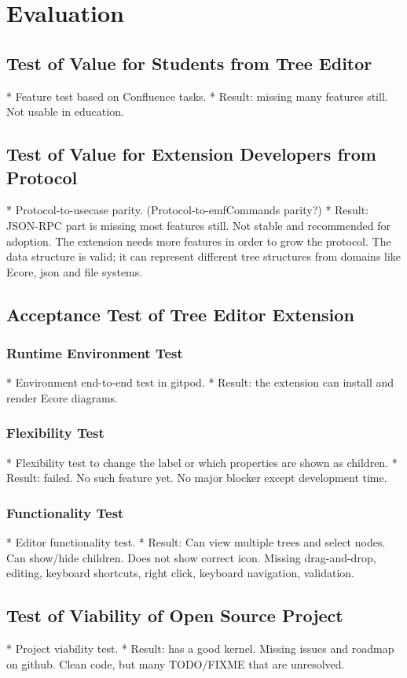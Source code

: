 \chapter{Evaluation}\label{chap:evaluation}


\section{Test of Value for Students from Tree Editor}

* Feature test based on Confluence tasks.
  * Result: missing many features still. Not usable in education.

\section{Test of Value for Extension Developers from Protocol}
* Protocol-to-usecase parity. (Protocol-to-emfCommands parity?)
  * Result: JSON-RPC part is missing most features still. Not stable and recommended for adoption. The extension needs more features in order to grow the protocol. The data structure is valid; it can represent different tree structures from domains like Ecore, json and file systems.

\section{Acceptance Test of Tree Editor Extension}

\subsection{Runtime Environment Test}
* Environment end-to-end test in gitpod.
  * Result: the extension can install and render Ecore diagrams.

\subsection{Flexibility Test}
* Flexibility test to change the label or which properties are shown as children.
  * Result: failed. No such feature yet. No major blocker except development time.

\subsection{Functionality Test}
* Editor functionality test.
  * Result: Can view multiple trees and select nodes. Can show/hide children. Does not show correct icon. Missing drag-and-drop, editing, keyboard shortcuts, right click, keyboard navigation, validation.

\section{Test of Viability of Open Source Project}
* Project viability test.
  * Result: has a good kernel. Missing issues and roadmap on github. Clean code, but many TODO/FIXME that are unresolved. 
  